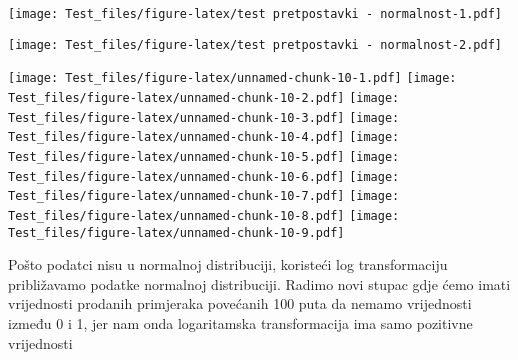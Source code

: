 \documentclass[
]{article}
\newenvironment{Shaded}{\begin{snugshade}}{\end{snugshade}}
\newcommand{\AttributeTok}[1]{\textcolor[rgb]{0.77,0.63,0.00}{#1}}
\newcommand{\FunctionTok}[1]{\textcolor[rgb]{0.00,0.00,0.00}{#1}}
\newcommand{\NormalTok}[1]{#1}
\newcommand{\SpecialCharTok}[1]{\textcolor[rgb]{0.00,0.00,0.00}{#1}}
\newcommand{\StringTok}[1]{\textcolor[rgb]{0.31,0.60,0.02}{#1}}
\begin{document}
\texttt{[image: Test\_files/figure-latex/test pretpostavki - normalnost-1.pdf]}

\begin{Shaded}
\end{Shaded}

\texttt{[image: Test\_files/figure-latex/test pretpostavki - normalnost-2.pdf]}

\texttt{[image: Test\_files/figure-latex/unnamed-chunk-10-1.pdf]}
\texttt{[image: Test\_files/figure-latex/unnamed-chunk-10-2.pdf]}
\texttt{[image: Test\_files/figure-latex/unnamed-chunk-10-3.pdf]}
\texttt{[image: Test\_files/figure-latex/unnamed-chunk-10-4.pdf]}
\texttt{[image: Test\_files/figure-latex/unnamed-chunk-10-5.pdf]}
\texttt{[image: Test\_files/figure-latex/unnamed-chunk-10-6.pdf]}
\texttt{[image: Test\_files/figure-latex/unnamed-chunk-10-7.pdf]}
\texttt{[image: Test\_files/figure-latex/unnamed-chunk-10-8.pdf]}
\texttt{[image: Test\_files/figure-latex/unnamed-chunk-10-9.pdf]}

Pošto podatci nisu u normalnoj distribuciji, koristeći log
transformaciju približavamo podatke normalnoj distribuciji. Radimo novi
stupac gdje ćemo imati vrijednosti prodanih primjeraka povećanih 100
puta da nemamo vrijednosti između 0 i 1, jer nam onda logaritamska
transformacija ima samo pozitivne vrijednosti
\end{document}
